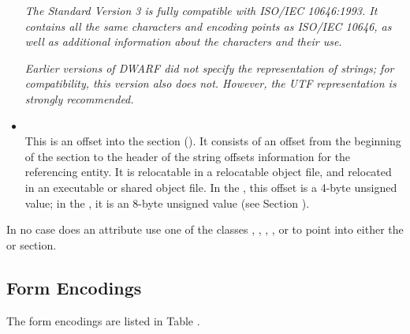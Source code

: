 \begin{itemize}
\textit{The  Standard Version 3 is fully compatible with
ISO/IEC 10646:1993. 
It contains all the same characters
and encoding points as ISO/IEC 10646, as well as additional
information about the characters and their use.}

\textit{Earlier versions of DWARF did not specify the representation
of strings; for compatibility, this version also does
not. However, the UTF representation is strongly recommended.}

\item \CLASSstroffsetsptr \\
This is an offset into the \dotdebugstroffsets{} section 
(\DWFORMsecoffset). It consists of an offset from the beginning of the 
\dotdebugstroffsets{} section to the
\bb
header
\eb
of the string offsets information for the
referencing entity. It is relocatable in
a relocatable object file, and relocated in an executable or
shared object file. In the \thirtytwobitdwarfformat, this offset
is a 4-byte unsigned value; in the \sixtyfourbitdwarfformat,
it is an 8-byte unsigned value (see Section
).

\end{itemize}

In no case does an attribute use one of the classes 
\CLASSaddrptr,
\CLASSlineptr,
\CLASSloclistsptr, 
\CLASSmacptr, 
\CLASSrnglistsptr{} or 
\CLASSstroffsetsptr{}
to point into either the
\dotdebuginfo{} or \dotdebugstr{} section.

\subsection{Form Encodings}
\label{datarep:formencodings}
The form encodings are listed in 
Table .

